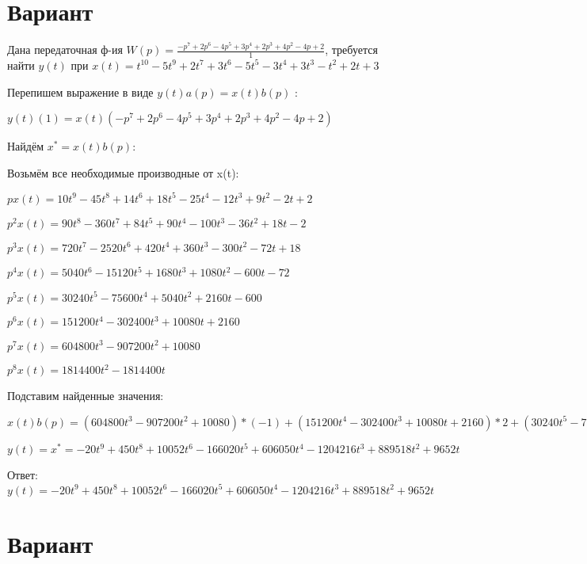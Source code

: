 \documentclass{article}
\begin{document}
{{{{{{\section{Вариант}

Дана передаточная ф-ия $W(p)=\frac{-p^{7}+2p^{6}-4p^{5}+3p^{4}+2p^{3}+4p^{2}-4p+2}{1}$, требуется найти $y(t)$ при $x(t)=t^{10}-5t^{9}+2t^{7}+3t^{6}-5t^{5}-3t^{4}+3t^{3}-t^{2}+2t+3$

Перепишем выражение в виде $y(t)a(p)=x(t)b(p)$ :

$y(t)(1)=x(t)(-p^{7}+2p^{6}-4p^{5}+3p^{4}+2p^{3}+4p^{2}-4p+2)$

Найдём $x^*=x(t)b(p)$:

Возьмём все необходимые производные от x(t):

$px(t)=10t^{9}-45t^{8}+14t^{6}+18t^{5}-25t^{4}-12t^{3}+9t^{2}-2t+2$

$p^2x(t)=90t^{8}-360t^{7}+84t^{5}+90t^{4}-100t^{3}-36t^{2}+18t-2$

$p^3x(t)=720t^{7}-2520t^{6}+420t^{4}+360t^{3}-300t^{2}-72t+18$

$p^4x(t)=5040t^{6}-15120t^{5}+1680t^{3}+1080t^{2}-600t-72$

$p^5x(t)=30240t^{5}-75600t^{4}+5040t^{2}+2160t-600$

$p^6x(t)=151200t^{4}-302400t^{3}+10080t+2160$

$p^7x(t)=604800t^{3}-907200t^{2}+10080$

$p^8x(t)=1814400t^{2}-1814400t$

Подставим найденные значения:

$x(t)b(p) = (604800t^{3}-907200t^{2}+10080)*(-1)+(151200t^{4}-302400t^{3}+10080t+2160)*2+(30240t^{5}-75600t^{4}+5040t^{2}+2160t-600)*(-4)+(5040t^{6}-15120t^{5}+1680t^{3}+1080t^{2}-600t-72)*3+(720t^{7}-2520t^{6}+420t^{4}+360t^{3}-300t^{2}-72t+18)*2+(90t^{8}-360t^{7}+84t^{5}+90t^{4}-100t^{3}-36t^{2}+18t-2)*4+(10t^{9}-45t^{8}+14t^{6}+18t^{5}-25t^{4}-12t^{3}+9t^{2}-2t+2)*(-4)+(10t^{9}-45t^{8}+14t^{6}+18t^{5}-25t^{4}-12t^{3}+9t^{2}-2t+2)*2=-20t^{9}+450t^{8}+10052t^{6}-166020t^{5}+606050t^{4}-1204216t^{3}+889518t^{2}+9652t$





$y(t)=x^*=-20t^{9}+450t^{8}+10052t^{6}-166020t^{5}+606050t^{4}-1204216t^{3}+889518t^{2}+9652t$

Ответ: $y(t) = -20t^{9}+450t^{8}+10052t^{6}-166020t^{5}+606050t^{4}-1204216t^{3}+889518t^{2}+9652t$

\section{Вариант}

}}}}}}
\end{document}

